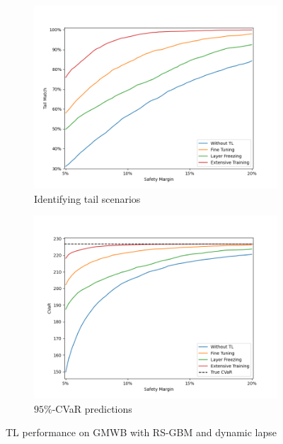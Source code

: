 \begin{figure}[ht!]
    \centering
    \begin{subfigure}{0.48\textwidth}
        \includegraphics[width=\textwidth]{./project3/figures/figure4_1.png}
        \caption{Identifying tail scenarios} 
        \label{subfig3-4-1:tail}
    \end{subfigure}\hfill
    \begin{subfigure}{0.48\textwidth}
        \includegraphics[width=\textwidth]{./project3/figures/figure4_2.png}
        \caption{$95\%$-CVaR predictions}
        \label{subfig3-4-2:CVaR}
    \end{subfigure}
    \caption{TL performance on GMWB with RS-GBM and dynamic lapse}
    \label{fig3:figure4-1}
\end{figure}

